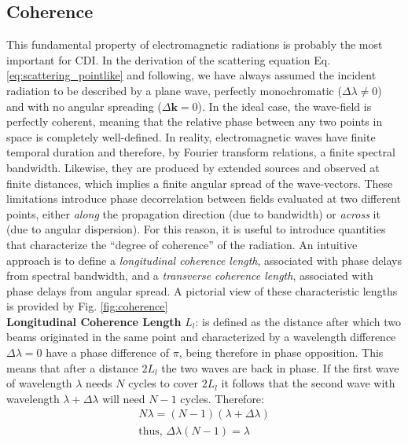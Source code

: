 \subsection{Coherence}

This fundamental property of electromagnetic radiations is probably the most important for CDI. In the derivation of the 
scattering equation Eq. \ref{eq:scattering_pointlike} and following, we have always assumed the incident radiation to be 
described by a plane wave, perfectly monochromatic ($\Delta \lambda \neq 0 $) and with no angular spreading ($\Delta \mathbf{k} = 0$). 
In the ideal case, the wave-field is perfectly coherent, meaning that the relative phase between any two points in space is 
completely well-defined.
In reality, electromagnetic waves have finite temporal duration and therefore, by Fourier transform relations, a finite 
spectral bandwidth. Likewise, they are produced by extended sources and observed at finite distances, which implies a 
finite angular spread of the wave-vectors.
These limitations introduce phase decorrelation between fields evaluated at two different points, either \textit{along} the propagation 
direction (due to bandwidth) or \textit{across} it (due to angular dispersion).
For this reason, it is useful to introduce quantities that characterize the ``degree of coherence'' of the radiation. 
An intuitive approach is to define a \textit{longitudinal coherence length}, associated with phase delays from spectral 
bandwidth, and a \textit{transverse coherence length}, associated with phase delays from angular spread. A pictorial 
view of these characteristic lengths is provided by Fig. \ref{fig:coherence} \\

\textbf{Longitudinal Coherence Length} $L_l$: is defined as the distance after which two beams originated in the same point and 
characterized by a wavelength difference $\Delta \lambda = 0 $ have a phase difference of $\pi$, being therefore in phase opposition. 
This means that after a distance $2L_l$ the two waves are back in phase. If the first wave of wavelength $\lambda$ needs 
$N$ cycles to cover $2L_l$ it follows that the second wave with wavelength $\lambda + \Delta \lambda$ will need $N-1$ cycles. 
Therefore: 
\begin{equation}
    \begin{aligned}
    N\lambda = (N-1)(\lambda + \Delta \lambda) \\
    \text{thus, } \Delta \lambda(N-1) = \lambda 
    \end{aligned}
\end{equation}

